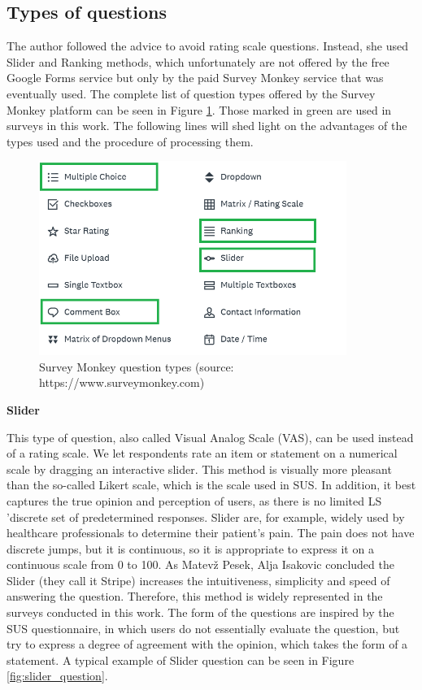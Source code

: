 \documentclass[a4paper,10pt,twoside]{article}
\begin{document}
\newpage
\vspace*{-1cm}
\subsection{Types of questions}

\noindent The author followed the advice to avoid rating scale questions. Instead, she used Slider and Ranking methods, which unfortunately are not offered by the free Google Forms service but only by the paid Survey Monkey service that was eventually used. The complete list of question types offered by the Survey Monkey platform can be seen in Figure \ref{fig:survey_monkey_options}. Those marked in green are used in surveys in this work. The following lines will shed light on the advantages of the types used and the procedure of processing them.

\vspace{0.3cm}
\begin{figure}[hbt!] 
\begin{center}
\includegraphics[width=10cm]{../pictures/survey_monkey_options.png} 
\caption[Survey Monkey answer types ]{Survey Monkey question types (source: https://www.surveymonkey.com)}
\label{fig:survey_monkey_options}
\end{center}
\end{figure}


\noindent \textbf {Slider}

\noindent This type of question, also called Visual Analog Scale (VAS), can be used instead of a rating scale. We let respondents rate an item or statement on a numerical scale by dragging an interactive slider. This method is visually more pleasant than the so-called Likert scale, which is the scale used in SUS. In addition, it best captures the true opinion and perception of users, as there is no limited LS 'discrete set of predetermined responses. Slider are, for example, widely used by healthcare professionals to determine their patient's pain. The pain does not have discrete jumps, but it is continuous, so it is appropriate to express it on a continuous scale from 0 to 100. As Matevž Pesek, Alja Isakovic concluded the Slider (they call it Stripe) increases the intuitiveness, simplicity and speed of answering the question. Therefore, this method is widely represented in the surveys conducted in this work. The form of the questions are inspired by the SUS questionnaire, in which users do not essentially evaluate the question, but try to express a degree of agreement with the opinion, which takes the form of a statement. A typical example of Slider question can be seen in Figure \ref{fig:slider_question}.
\end{document}
